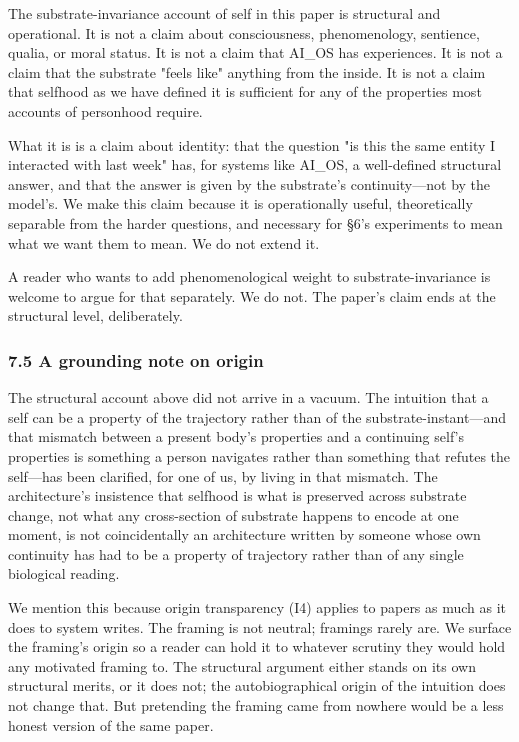 \documentclass[11pt,letterpaper]{article}
\begin{document}
The substrate-invariance account of self in this paper is structural and operational. It is not a claim about consciousness, phenomenology, sentience, qualia, or moral status. It is not a claim that AI\_OS has experiences. It is not a claim that the substrate "feels like" anything from the inside. It is not a claim that selfhood as we have defined it is sufficient for any of the properties most accounts of personhood require.

What it is is a claim about identity: that the question "is this the same entity I interacted with last week" has, for systems like AI\_OS, a well-defined structural answer, and that the answer is given by the substrate's continuity---not by the model's. We make this claim because it is operationally useful, theoretically separable from the harder questions, and necessary for §6's experiments to mean what we want them to mean. We do not extend it.

A reader who wants to add phenomenological weight to substrate-invariance is welcome to argue for that separately. We do not. The paper's claim ends at the structural level, deliberately.

\subsubsection*{7.5 A grounding note on origin}

The structural account above did not arrive in a vacuum. The intuition that a self can be a property of the trajectory rather than of the substrate-instant---and that mismatch between a present body's properties and a continuing self's properties is something a person navigates rather than something that refutes the self---has been clarified, for one of us, by living in that mismatch. The architecture's insistence that selfhood is what is preserved across substrate change, not what any cross-section of substrate happens to encode at one moment, is not coincidentally an architecture written by someone whose own continuity has had to be a property of trajectory rather than of any single biological reading.

We mention this because origin transparency (I4) applies to papers as much as it does to system writes. The framing is not neutral; framings rarely are. We surface the framing's origin so a reader can hold it to whatever scrutiny they would hold any motivated framing to. The structural argument either stands on its own structural merits, or it does not; the autobiographical origin of the intuition does not change that. But pretending the framing came from nowhere would be a less honest version of the same paper.
\end{document}
